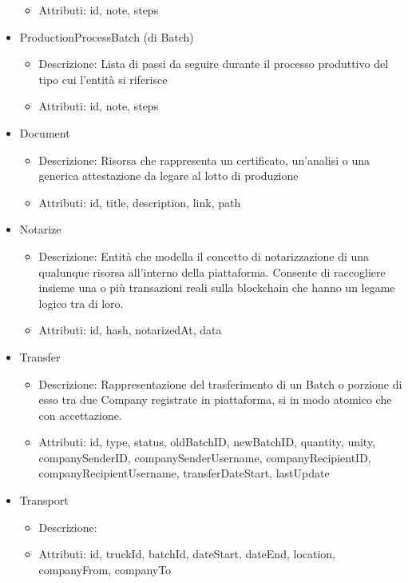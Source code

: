 \documentclass[a4paper,11pt]{article}
\begin{document}
\begin{itemize}
\begin{itemize}
          \item Attributi: id, note, steps
        \end{itemize}
  \item ProductionProcessBatch (di Batch)
        \begin{itemize}
          \item Descrizione: Lista di passi da seguire durante il processo produttivo del tipo cui l'entità si riferisce
          \item Attributi: id, note, steps
        \end{itemize}
  \item Document
        \begin{itemize}
          \item Descrizione: Risorsa che rappresenta un certificato, un'analisi o una generica attestazione da legare al lotto di produzione
          \item Attributi: id, title, description, link, path
        \end{itemize}
  \item Notarize
        \begin{itemize}
          \item Descrizione: Entità che modella il concetto di notarizzazione di una qualunque risorsa all'interno della piattaforma. Consente di raccogliere insieme una o più transazioni reali sulla blockchain che hanno un legame logico tra di loro.
          \item Attributi: id, hash, notarizedAt, data
        \end{itemize}
  \item Transfer
        \begin{itemize}
          \item Descrizione: Rappresentazione del trasferimento di un Batch o porzione di esso tra due Company registrate in piattaforma, si in modo atomico che con accettazione.
          \item Attributi: id, type, status, oldBatchID, newBatchID, quantity, unity, companySenderID, companySenderUsername, companyRecipientID, companyRecipientUsername, transferDateStart, lastUpdate
        \end{itemize}
  \item Transport
        \begin{itemize}
          \item Descrizione:
          \item Attributi: id, truckId, batchId, dateStart, dateEnd, location, companyFrom, companyTo

\end{itemize}
\end{itemize}
\end{document}
